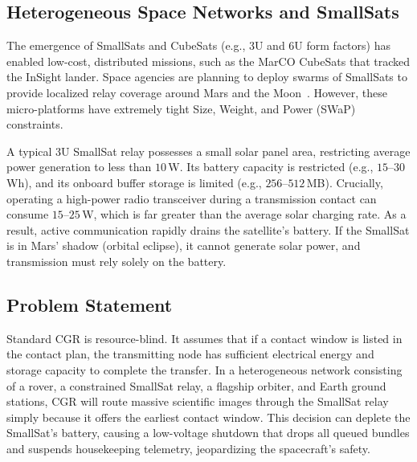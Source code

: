 \documentclass[journal,twocolumn]{IEEEtran}
\begin{document}
\subsection{Heterogeneous Space Networks and SmallSats}
The emergence of SmallSats and CubeSats (e.g., 3U and 6U form factors) has enabled low-cost, distributed missions, such as the MarCO CubeSats that tracked the InSight lander. Space agencies are planning to deploy swarms of SmallSats to provide localized relay coverage around Mars and the Moon~\cite{nasa2022artemis,yang2016smallsat}. However, these micro-platforms have extremely tight Size, Weight, and Power (SWaP) constraints. 

A typical 3U SmallSat relay possesses a small solar panel area, restricting average power generation to less than $10\,$W. Its battery capacity is restricted (e.g., $15$--$30\,$Wh), and its onboard buffer storage is limited (e.g., $256$--$512\,$MB). Crucially, operating a high-power radio transceiver during a transmission contact can consume $15$--$25\,$W, which is far greater than the average solar charging rate. As a result, active communication rapidly drains the satellite's battery. If the SmallSat is in Mars' shadow (orbital eclipse), it cannot generate solar power, and transmission must rely solely on the battery.

\subsection{Problem Statement}
Standard CGR is resource-blind. It assumes that if a contact window is listed in the contact plan, the transmitting node has sufficient electrical energy and storage capacity to complete the transfer. In a heterogeneous network consisting of a rover, a constrained SmallSat relay, a flagship orbiter, and Earth ground stations, CGR will route massive scientific images through the SmallSat relay simply because it offers the earliest contact window. This decision can deplete the SmallSat's battery, causing a low-voltage shutdown that drops all queued bundles and suspends housekeeping telemetry, jeopardizing the spacecraft's safety.
\end{document}
